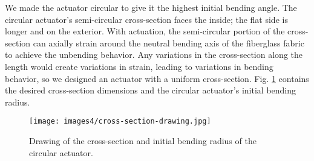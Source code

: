 We made the actuator circular to give it the highest initial bending angle. The circular actuator's semi-circular cross-section faces the inside; the flat side is longer and on the exterior. With actuation, the semi-circular portion of the cross-section can axially strain around the neutral bending axis of the fiberglass fabric to achieve the unbending behavior. Any variations in the cross-section along the length would create variations in strain, leading to variations in bending behavior, so we designed an actuator with a uniform cross-section. Fig. \ref{fig:crosssection} contains the desired cross-section dimensions and the circular actuator's initial bending radius.

\begin{figure}[ht]
    \centering
    \texttt{[image: images4/cross-section-drawing.jpg]}
    \caption{Drawing of the cross-section and initial bending radius of the circular actuator.}
    \label{fig:crosssection}
\end{figure}